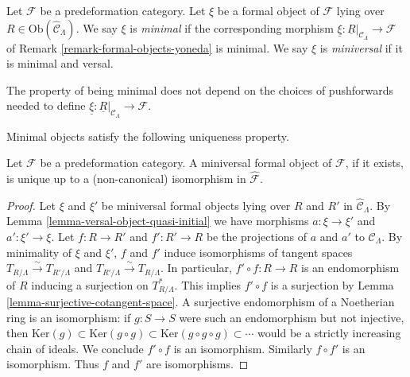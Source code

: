 \begin{definition}
\label{definition-miniversal-object}
Let $\mathcal{F}$ be a predeformation category.  Let $\xi$ be a formal object of 
$\mathcal{F}$ lying over $R \in \text{Ob}(\widehat{\mathcal 
C}_\Lambda)$.  We say $\xi$ is {\it minimal} if the corresponding morphism 
$\underline{\xi}: \underline{R}|_{\mathcal{C}_\Lambda} \to \mathcal{F}$ 
of Remark \ref{remark-formal-objects-yoneda} is minimal.  We say $\xi$ is 
{\it miniversal} if it is minimal and versal.
\end{definition}

\begin{remark}
\label{remark-choice-pushforwards-iso-class}
The property of being minimal does not depend on the choices of pushforwards 
needed to define $\underline{\xi}: \underline{R}|_{\mathcal{C}_\Lambda} 
\to \mathcal{F}$.
\end{remark}

\noindent
Minimal objects satisfy the following uniqueness property.

\begin{lemma}
\label{lemma-miniversal-object-unique}
Let $\mathcal{F}$ be a predeformation category.  A miniversal formal object of 
$\mathcal{F}$, if it exists, is unique up to a (non-canonical) isomorphism in 
$\widehat{\mathcal{F}}$.
\end{lemma}

\begin{proof}
Let $\xi$ and $\xi'$ be miniversal formal objects lying over $R$ and $R'$ in 
$\widehat{\mathcal{C}}_\Lambda$.  By
Lemma \ref{lemma-versal-object-quasi-initial}
we have morphisms $a: \xi \to 
\xi'$ and $a': \xi' \to \xi$.  Let $f:R \to R'$ and $f': R' 
\to R$ be the projections of $a$ and $a'$ to $\mathcal{C}_\Lambda$.  
By minimality of $\xi$ and $\xi'$, $f$ and $f'$ induce isomorphisms of tangent 
spaces $T_{R/\Lambda} \xrightarrow{\sim} T_{R'/\Lambda}$ and $T_{R'/\Lambda} 
\xrightarrow{\sim} T_{R/\Lambda}$.  In particular, $f' \circ f: R \to 
R$ is an endomorphism of $R$ inducing a surjection on $T^*_{R/\Lambda}$. This 
implies $f' \circ f$ is a surjection by Lemma 
\ref{lemma-surjective-cotangent-space}. A surjective endomorphism of a 
Noetherian ring is an isomorphism: if $g: S \to S$ were such an 
endomorphism but not injective, then $\text{Ker}(g) \subset 
\text{Ker}(g \circ g) \subset \text{Ker}(g \circ g \circ g) \subset 
\cdots$ would be a strictly increasing chain of ideals.  We conclude $f' \circ 
f$ is an isomorphism.  Similarly $f \circ f'$ is an isomorphism.  Thus $f$ and 
$f'$ are isomorphisms.
\end{proof}

